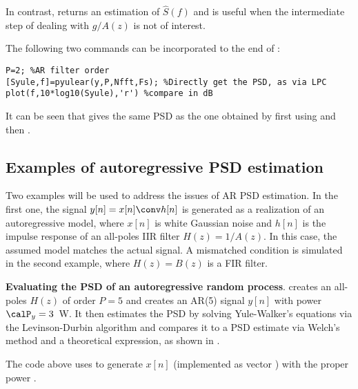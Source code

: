 In contrast,  returns an estimation of $\hat S(f)$ and is useful when the intermediate step of dealing with $g/A(z)$ is not of interest. 

The following two commands can be incorporated to the end of :
\begin{lstlisting}
P=2; %AR filter order
[Syule,f]=pyulear(y,P,Nfft,Fs); %Directly get the PSD, as via LPC
plot(f,10*log10(Syule),'r') %compare in dB
\end{lstlisting}
It can be seen that  gives the same PSD as the one obtained by first using  and then .

\subsection{Examples of autoregressive PSD estimation}

Two examples will be used to address the issues of AR PSD estimation. In the first one, the signal $y[n] = x[n] \conv h[n]$ is generated as a realization of an autoregressive model, where $x[n]$ is white Gaussian noise and $h[n]$ is the impulse response of an all-poles IIR filter $H(z)=1/A(z)$. 
In this case, the assumed model matches the actual signal. A mismatched condition is simulated in the second example, where $H(z)=B(z)$ is a FIR filter.


\bExample \textbf{Evaluating the PSD of an autoregressive random process}.
 creates an all-poles $H(z)$ of order $P=5$ and creates an AR(5) signal $y[n]$ with power $\calP_y=3$~W. 
It then estimates the PSD by solving Yule-Walker's equations via the Levinson-Durbin algorithm and compares it to a PSD estimate via Welch's method and a theoretical expression, as shown in .

The code above uses  to generate $x[n]$ (implemented as vector ) with the proper power . 

%

